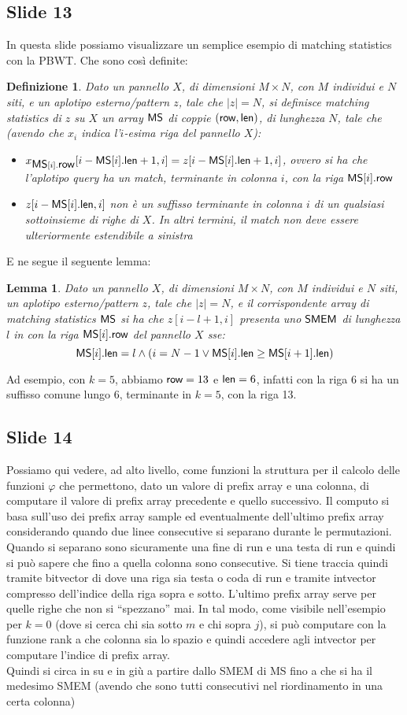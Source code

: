 \documentclass[a4paper,11pt, oneside,italian]{article}
\newtheorem{definizione}{Definizione}
\newtheorem{lemma}{Lemma}
\def\len{\mbox{\rm {\sf len}}}
\def\row{\mbox{\rm {\sf row}}}
\def\MS{\mbox{\rm {\sf MS}}}
\def\SMEM{\mbox{\rm {\sf SMEM}}}
\begin{document}
\subsection*{Slide 13}
In questa slide possiamo visualizzare un semplice esempio di matching statistics
con la PBWT. Che sono così definite:
\begin{definizione}
  Dato un pannello $X$, di dimensioni $M\times N$, con $M$ individui e $N$ siti,
  e un aplotipo esterno/pattern $z$, tale che $|z|=N$, si definisce matching
  statistics di $z$ su $X$ un array $\MS$ di coppie $(\row,\len)$, di lunghezza
  $N$, tale che (avendo che $x_i$ indica l'$i$-esima riga del pannello $X$): 
  \begin{itemize}
    \item $x_{\MS[i].\row}[i-\MS[i].\len+1,i]=z[i-\MS[i].\len+1,i]$, ovvero si
    ha che 
    l'aplotipo query ha un match, terminante in colonna $i$, con la riga
    $\MS[i].\row$  
    \item $z[i-\MS[i].\len,i]$ non è un suffisso terminante in colonna $i$ di un
    qualsiasi sottoinsieme di righe di $X$. In altri termini, il match non deve
    essere ulteriormente estendibile a sinistra
  \end{itemize}
\end{definizione}
E ne segue il seguente lemma:
\begin{lemma}
  Dato un pannello $X$, di dimensioni $M\times N$, con $M$ individui e $N$
  siti, un aplotipo esterno/pattern $z$, tale che $|z|=N$, e il corrispondente
  array di matching statistics $\MS$ si ha che $z[i-l+1,i]$
  presenta uno $\SMEM$ di lunghezza $l$ in con la riga $\MS[i].\row$ del
  pannello $X$ sse: 
  \[\MS[i].\len=l\land(i=N-1\lor \MS[i].\len\geq \MS[i+1].\len)\]
\end{lemma}
Ad esempio, con $k=5$, abbiamo $\row=13$ e $\len=6$, infatti con la riga 6 si ha
un suffisso comune lungo 6, terminante in $k=5$, con la riga 13.
\subsection*{Slide 14}
Possiamo qui vedere, ad alto livello, come funzioni la struttura per il calcolo
delle funzioni $\varphi$ che permettono, dato un valore di prefix array e una
colonna, di computare il valore di prefix array precedente e quello
successivo. Il computo si basa sull'uso dei prefix array sample ed eventualmente
dell'ultimo prefix array considerando quando due linee consecutive si separano
durante le permutazioni. Quando si separano sono sicuramente una fine di run e
una testa di run e quindi si può sapere che fino a quella colonna sono
consecutive. Si tiene traccia quindi tramite bitvector di dove una riga sia
testa o coda di run e tramite intvector compresso dell'indice della riga sopra e
sotto. L'ultimo prefix array serve per quelle righe che non si ``spezzano'' mai.
In tal modo, come visibile nell'esempio per $k=0$ (dove si cerca chi sia sotto
$m$ e chi sopra $j$), si può computare con la
funzione rank a che colonna sia lo spazio e quindi accedere agli intvector per
computare l'indice di prefix array.\\
Quindi si circa in su e in giù a partire dallo SMEM di MS fino a che si ha il
medesimo SMEM (avendo che sono tutti consecutivi nel riordinamento in una certa
colonna)
\end{document}
